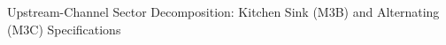 
\begin{table}[!htbp]
\centering
\small
\caption{Upstream-Channel Sector Decomposition: Kitchen Sink (M3B) and Alternating (M3C) Specifications}
\label{tab:extended_results}


\end{table}

